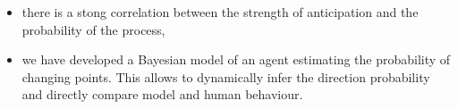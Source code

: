 \documentclass[profile,final,english, draft]{article}%
\begin{document}
\begin{multicols}{3}
\begin{itemize}
\item there is a stong correlation between the strength of anticipation and the probability of the process,

\item we have developed a Bayesian model of an agent estimating the probability of changing points. This allows to dynamically infer the direction probability and directly compare model and human behaviour.

\end{itemize}

{\tiny
\printbibliography
}


\end{multicols}


\end{document}
